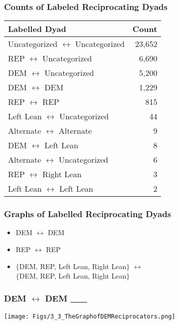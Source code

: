\documentclass{beamer}
\begin{document}
\begin{frame}
\frametitle{Counts of Labeled Reciprocating Dyads}

\begin{table}[!htb]
\centering
\begin{tabular}{lr}
\toprule
               {\bf{Labelled Dyad}} &       {\bf{Count}} \\
\midrule

Uncategorized $\leftrightarrow$ Uncategorized & 23,652\\
REP $\leftrightarrow$  Uncategorized & 6,690\\
DEM  $\leftrightarrow$  Uncategorized & 5,200\\
DEM $\leftrightarrow$ DEM & 1,229\\
REP $\leftrightarrow$  REP & 815\\
Left Lean $\leftrightarrow$ Uncategorized & 44\\
Alternate $\leftrightarrow$ Alternate & 9\\
DEM  $\leftrightarrow$ Left Lean & 8\\
Alternate $\leftrightarrow$ Uncategorized & 6\\
REP $\leftrightarrow$  Right Lean & 3\\
Left Lean $\leftrightarrow$ Left Lean & 2\\
\bottomrule
\end{tabular}
\end{table}

\end{frame}





\begin{frame}
\frametitle{Graphs of Labelled Reciprocating Dyads}

\begin{center}
\Large
\begin{itemize}
\item DEM $\leftrightarrow$ DEM%
\item REP $\leftrightarrow$ REP%
\item $\{$DEM, REP, Left Lean, Right Lean$\}$ $\leftrightarrow$ \\ $\{$DEM, REP, Left Lean, Right Lean$\}$%
\end{itemize}
\end{center}

\end{frame}


\begin{frame}
\frametitle{DEM $\leftrightarrow$ DEM \phantom{This text will be invisible be invisible} \href{http://politicalnets.com/view/gcc_ddr}{\texttt{\textcolor{white}{Link}}}} 

\begin{center}
\texttt{[image: Figs/3\_3\_TheGraphofDEMReciprocators.png]} \hspace*{4cm}
\end{center}

\end{frame}
\end{document}
